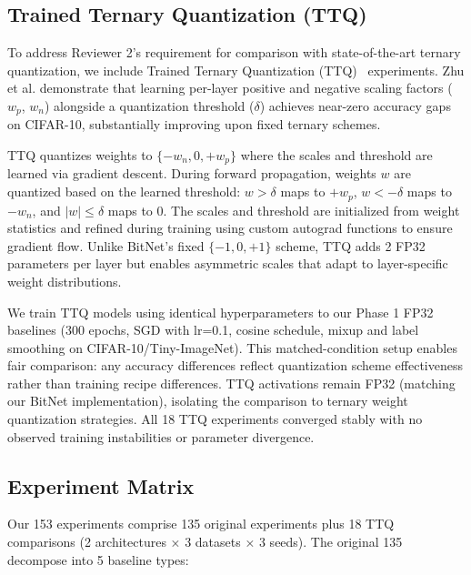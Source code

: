 \subsection{Trained Ternary Quantization (TTQ)}

To address Reviewer 2's requirement for comparison with state-of-the-art ternary quantization, we include Trained Ternary Quantization (TTQ)~\cite{zhu2017ttq} experiments. Zhu et al. demonstrate that learning per-layer positive and negative scaling factors ($w_p$, $w_n$) alongside a quantization threshold ($\delta$) achieves near-zero accuracy gaps on CIFAR-10, substantially improving upon fixed ternary schemes.

TTQ quantizes weights to $\{-w_n, 0, +w_p\}$ where the scales and threshold are learned via gradient descent. During forward propagation, weights $w$ are quantized based on the learned threshold: $w > \delta$ maps to $+w_p$, $w < -\delta$ maps to $-w_n$, and $|w| \leq \delta$ maps to $0$. The scales and threshold are initialized from weight statistics and refined during training using custom autograd functions to ensure gradient flow. Unlike BitNet's fixed $\{-1, 0, +1\}$ scheme, TTQ adds 2 FP32 parameters per layer but enables asymmetric scales that adapt to layer-specific weight distributions.

We train TTQ models using identical hyperparameters to our Phase 1 FP32 baselines (300 epochs, SGD with lr=0.1, cosine schedule, mixup and label smoothing on CIFAR-10/Tiny-ImageNet). This matched-condition setup enables fair comparison: any accuracy differences reflect quantization scheme effectiveness rather than training recipe differences. TTQ activations remain FP32 (matching our BitNet implementation), isolating the comparison to ternary weight quantization strategies. All 18 TTQ experiments converged stably with no observed training instabilities or parameter divergence.

\subsection{Experiment Matrix}

Our 153 experiments comprise 135 original experiments plus 18 TTQ comparisons (2 architectures × 3 datasets × 3 seeds). The original 135 decompose into 5 baseline types:

